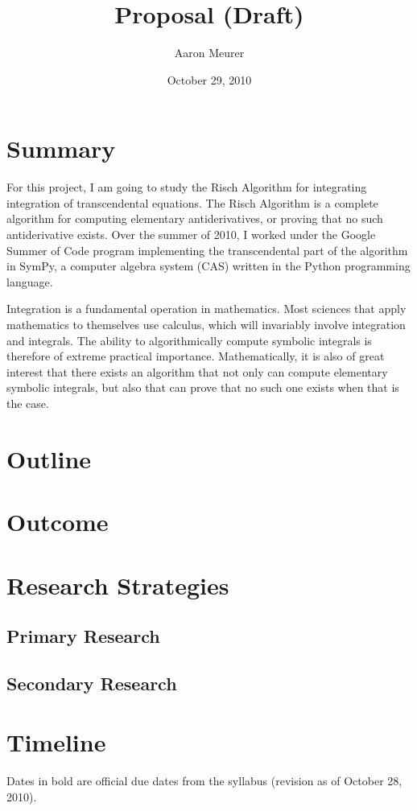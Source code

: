 \documentclass[12pt]{article}
\begin{document}
\title{Proposal (Draft)}
\author{Aaron Meurer}
\date{October 29, 2010}
\maketitle
\section{Summary}
For this project, I am going to study the Risch Algorithm for
integrating integration of transcendental equations.  The Risch
Algorithm is a complete algorithm for computing elementary
antiderivatives, or proving that no such antiderivative exists.  Over
the summer of 2010, I worked under the Google Summer of Code program
implementing the transcendental part of the algorithm in SymPy, a
computer algebra system (CAS) written in the Python programming
language.

Integration is a fundamental operation in mathematics.  Most sciences
that apply mathematics to themselves use calculus, which will invariably
involve integration and integrals.  The ability to algorithmically
compute symbolic integrals is therefore of extreme practical importance.
 Mathematically, it is also of great interest that there exists an
algorithm that not only can compute elementary symbolic integrals, but
also that can prove that no such one exists when that is the case.

\section{Outline}

\section{Outcome}

\section{Research Strategies}
\subsection{Primary Research}

\subsection{Secondary Research}
\label{secondary-research}

\section{Timeline}
Dates in bold are official due dates from the syllabus (revision as of October 28, 2010).  
\end{document}
